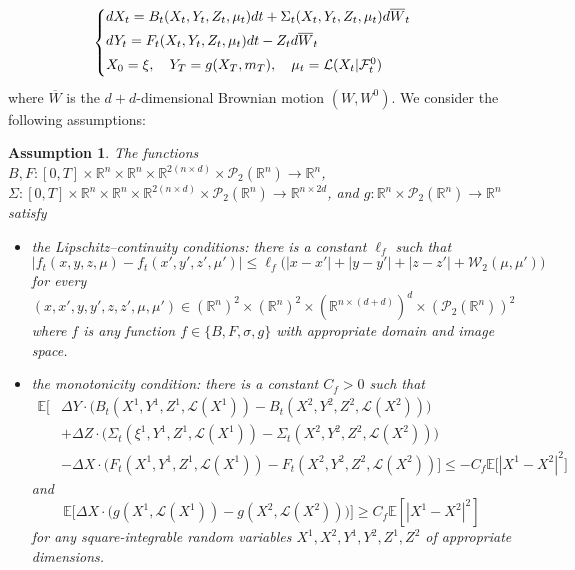 \documentclass[11pt,reqno]{amsart}
\numberwithin{equation}{section}
\newtheorem{assumption}[theorem]{Assumption}
\theoremstyle{definition}
\def\E{{\mathbb E}}
\def\R{{\mathbb R}}
\def\P{{\mathcal P}}
\newcommand{\ov}{\overline}
\newcommand\cF{\mathcal F}
\newcommand\cL{\mathcal L}
\newcommand\cP{\mathcal P}
\newcommand\cW{\mathcal W}
\def \E{\mathbb{E}}
\def \H{\mathbb{H}}
\def \P{\mathbb{P}}
\def \R{\mathbb{R}}
\begin{document}
\begin{equation}
\label{eq:fbsde.gen}
  \begin{cases}\vspace{.1cm}
    dX_t =  B_t(X_t, Y_t, Z_t, \mu_t)dt + \Sigma_t(X_t, Y_t, Z_t, \mu_t)d\ov W_t\\\vspace{.1cm}
    dY_t = F_t(X_t, Y_t, Z_t, \mu_t)dt  - Z_td \ov W_t\\\vspace{.1cm}
    X_0 = \xi,\quad Y_T= g(X_T, m_T),\quad \mu_t =\cL(X_t|\cF^0_t)
  \end{cases}
\end{equation}
where $\ov W$ is the $d + d$-dimensional Brownian motion $(W, W^0)$.
We consider the following assumptions:
\begin{assumption}
\label{ass.fbsde.gen}
 The functions $B,F: [0,T] \times \R^n\times \R^{n}\times \R^{2(n\times d)} \times \cP_2(\R^n)\to \R^n $, $\Sigma:[0,T] \times \R^n\times \R^{n}\times \R^{2(n\times d)} \times \cP_2(\R^n)\to \R^{n\times 2d} $, and $g: \R^n\times \cP_2(\R^n)\to \R^n$ satisfy
 \begin{itemize}
  \item[(i)] the Lipschitz--continuity conditions: there is a constant $\ell_f$ such that
  \begin{equation*}
    |f_t(x,y, z,\mu) - f_t(x', y',z', \mu')|\le \ell_f\big(|x - x'| + |y - y'| + |z - z'| + \cW_2(\mu, \mu') \big) 
  \end{equation*}
  for every $(x, x', y,y', z,z', \mu, \mu')\in (\R^n)^2\times (\R^n)^2\times (\R^{n\times (d + d)})^d \times (\cP_2(\R^n))^2$ where $f$ is any function $f \in \{B, F, \sigma, g\}$ with appropriate domain and image space.
  \item[(ii)] the monotonicity condition: there is a constant $C_f>0$ such that
  \begin{align*}
    \E\Big[&\Delta Y \cdot\big(B_t(X^1, Y^1, Z^1, \cL(X^1)) - B_t(X^2, Y^2, Z^2, \cL(X^2))\big) \\
    &+ \Delta Z\cdot\big(\Sigma_t(\xi^1, Y^1, Z^1, \cL(X^1)) - \Sigma_t(X^2, Y^2, Z^2, \cL(X^2)) \big)\\
     &- \Delta X\cdot \big(F_t(X^1, Y^1, Z^1, \cL(X^1)) - F_t(X^2, Y^2, Z^2, \cL(X^2))\Big] \le - C_f\E\big[|X^1 - X^2 |^2\big]
  \end{align*}
  and
  \begin{equation*}
    \E\Big[ \Delta X\cdot\big( g(X^1, \cL(X^1)) - g(X^2, \cL(X^2))\big)\Big] \ge C_f\E[|X^1 - X^2|^2]
  \end{equation*}
  for any square-integrable random variables $X^1,X^2,Y^1,Y^2,Z^1,Z^2$ of appropriate dimensions.
\end{itemize}
\end{assumption}
\end{document}
